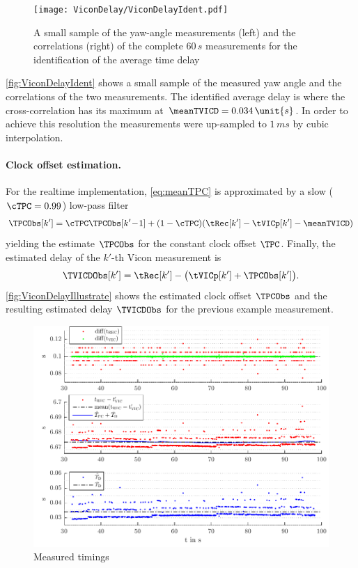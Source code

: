 \begin{figure}[ht]
 \centering
 \texttt{[image: ViconDelay/ViconDelayIdent.pdf]}
 \caption{A small sample of the yaw-angle measurements (left) and the correlations (right) of the complete $60\,\unit{s}$ measurements for the identification of the average time delay}
 \label{fig:ViconDelayIdent}
\end{figure}

\autoref{fig:ViconDelayIdent} shows a small sample of the measured yaw angle and the correlations of the two measurements.
The identified average delay is where the cross-correlation has its maximum at $\meanTVICD = 0.034\,\unit{s}$.
In order to achieve this resolution the measurements were up-sampled to $1\,\unit{ms}$ by cubic interpolation.


\paragraph{Clock offset estimation.}
For the realtime implementation, \eqref{eq:meanTPC} is approximated by a slow ($\cTPC = 0.99$) low-pass filter
\begin{align}
 \TPCObs[k'] = \cTPC \TPCObs[k'\!-\!1] + (1-\cTPC) (\tRec[k'] - \tVICp[k'] - \meanTVICD)
\end{align}
yielding the estimate $\TPCObs$ for the constant clock offset $\TPC$.
Finally, the estimated delay of the $k'$-th Vicon measurement is
\begin{align}
 \TVICDObs[k'] = \tRec[k'] - \big( \tVICp[k'] + \TPCObs[k'] \big).
\end{align}
\autoref{fig:ViconDelayIllustrate} shows the estimated clock offset $\TPCObs$ and the resulting estimated delay $\TVICDObs$ for the previous example measurement.

\begin{figure}[ht]
 \centering
 \includegraphics{graphics/ViconDelay/ViconDelayIllustrate}                                                                    
 \caption{Measured timings}
 \label{fig:ViconDelayIllustrate}
\end{figure}

